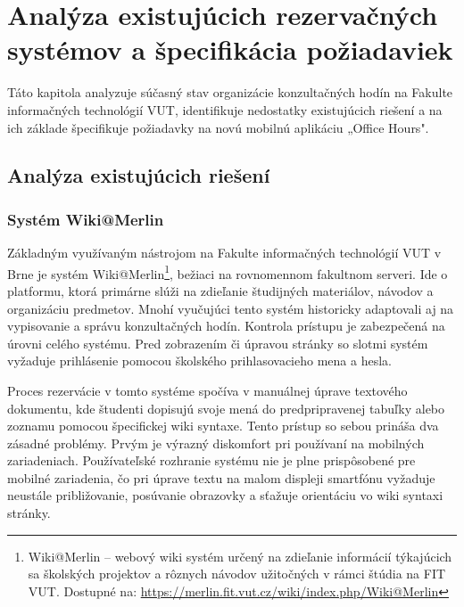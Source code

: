 \chapter{Analýza existujúcich rezervačných systémov a špecifikácia požiadaviek}\label{chap:analyza}
Táto kapitola analyzuje súčasný stav organizácie konzultačných hodín na Fakulte informačných technológií VUT, identifikuje nedostatky existujúcich riešení a na ich základe špecifikuje požiadavky na novú mobilnú aplikáciu „Office Hours".

\section{Analýza existujúcich riešení}
\subsection{Systém Wiki@Merlin}
Základným využívaným nástrojom na Fakulte informačných technológií VUT v Brne je systém Wiki@Merlin\footnote{Wiki@Merlin – webový wiki systém určený na zdieľanie informácií týkajúcich sa školských projektov a rôznych návodov užitočných v rámci štúdia na FIT VUT. Dostupné na: \url{https://merlin.fit.vut.cz/wiki/index.php/Wiki@Merlin}}, bežiaci na rovnomennom fakultnom serveri. Ide o platformu, ktorá primárne slúži na zdieľanie študijných materiálov, návodov a organizáciu predmetov. Mnohí vyučujúci tento systém historicky adaptovali aj na vypisovanie a správu konzultačných hodín. Kontrola prístupu je zabezpečená na úrovni celého systému. Pred zobrazením či úpravou stránky so slotmi systém vyžaduje prihlásenie pomocou školského prihlasovacieho mena a hesla.

Proces rezervácie v tomto systéme spočíva v manuálnej úprave textového dokumentu, kde študenti dopisujú svoje mená do predpripravenej tabuľky alebo zoznamu pomocou špecifickej wiki syntaxe. Tento prístup so sebou prináša dva zásadné problémy. Prvým je výrazný diskomfort pri používaní na mobilných zariadeniach. Používateľské rozhranie systému nie je plne prispôsobené pre mobilné zariadenia, čo pri úprave textu na malom displeji smartfónu vyžaduje neustále približovanie, posúvanie obrazovky a sťažuje orientáciu vo wiki syntaxi stránky.

